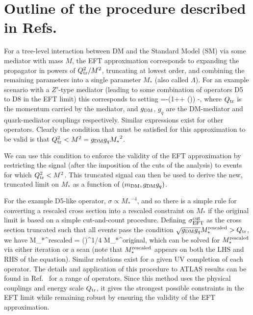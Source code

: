 \section{Outline of the procedure described in Refs.~\cite{Busoni:2014sya,Aad:2015zva}}

For a tree-level interaction between DM and the Standard Model (SM) via some mediator with mass $M$, the EFT approximation corresponds to expanding the propagator 
in powers of $Q_{\rm tr}^2/M^2$, truncating at lowest order, and combining the remaining parameters into a single parameter ${M_*}$ (also called $\Lambda$). For an example scenario with a $Z'$-type mediator (leading to some combination of operators D5 to D8 in the EFT limit)
this corresponds to setting
%
\be
{}=-\left(1++  \left(\right)\right) \simeq -,
\ee
%
where $Q_{\rm tr}$ is the momentum carried by the mediator, and $g_{\rm DM}$, $g_q$ are the DM-mediator and quark-mediator couplings respectively. Similar expressions exist for other operators. Clearly the condition that must be satisfied for this approximation to be valid is that $Q_{\rm tr}^2 < M^2 = g_{\rm DM} g_q {M_*}^2$. 

We can use this condition to enforce the validity of the EFT approximation by restricting the signal (after the imposition of the cuts of the analysis) to events for which $Q_{\rm tr}^2 < M^2$. This truncated signal can then be used to derive the new, truncated limit on $M_*$ as a function of $(m_{\rm DM}, g_{\rm DM} g_q)$.

For the example D5-like operator, $\sigma \propto {M_*}^{-4}$, and so there is a simple rule for converting a rescaled cross section into a rescaled constraint on ${M_*}$ if the original limit is based on a simple cut-and-count procedure. Defining $\sigma_{\rm EFT}^{\rm cut}$ as the cross section truncated such that all events pass the condition $\sqrt{g_{\rm DM} g_q} M_*^{\rm rescaled} > Q_{\rm tr}$, we have
%
\be
M_*^{\rm rescaled} = \left(\right)^{1/4} M_*^{\rm original},
\ee
%
which can be solved for $M_*^{\rm rescaled}$ via either iteration or a scan (note that $M_*^{\rm rescaled}$ appears on both the LHS and RHS of the equation). Similar relations exist for a given UV completion of each operator. The details and application of this procedure to ATLAS results can be found in Ref.~\cite{Aad:2015zva} for a range of operators. Since this method uses the physical couplings and energy scale $Q_{\rm tr}$, it gives the strongest possible constraints in the EFT limit while remaining robust by ensuring the validity of the EFT approximation. 

